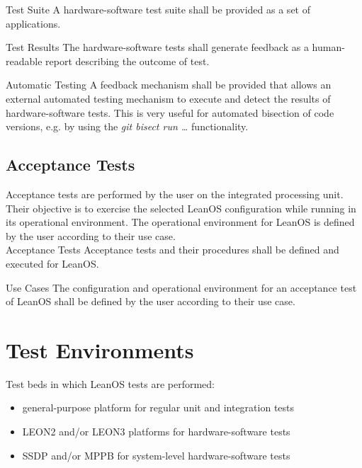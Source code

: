  {Test Suite}{%
A hardware-software test suite shall be provided as a set of applications.
}{}

 {Test Results}{%
The hardware-software tests shall generate feedback as a human-readable %
report describing the outcome of test.%
}{}


 {Automatic Testing}{%
A feedback mechanism shall be provided that allows an external automated %
testing mechanism to execute and detect the results of hardware-software tests.%
}{This is very useful for automated bisection of code versions, e.g. by %
using the \emph{git bisect run \ldots} functionality.}%


\section {Acceptance Tests}

Acceptance tests are performed by the user on the integrated processing unit.
Their objective is to exercise the selected LeanOS configuration while running
in its operational environment. The operational environment for LeanOS is
defined by the user according to their use case.\\



 {Acceptance Tests}{%
Acceptance tests and their procedures shall be defined and executed for LeanOS.
}{}

 {Use Cases}{%
The configuration and operational environment for an acceptance test of LeanOS
shall be defined by the user according to their use case.
}{}




\chapter{Test Environments}

Test beds in which LeanOS tests are performed:

\begin{itemize}
	\item general-purpose platform for regular unit and integration tests
	\item \gls{LEON2} and/or \gls{LEON3} platforms for hardware-software tests
	\item \gls{SSDP} and/or \gls{MPPB} for system-level hardware-software tests
\end{itemize}

